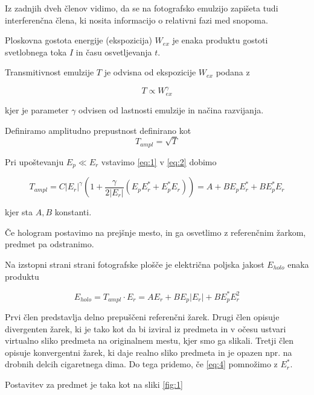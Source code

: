 \documentclass[11pt]{article}
\begin{document}
Iz zadnjih dveh členov vidimo, da se na fotografsko emulzijo zapišeta tudi interferenčna člena, ki nosita informacijo o relativni fazi med snopoma.

Ploskovna gostota energije (ekspozicija) \(W_{ex}\) je enaka produktu gostoti svetlobnega toka \(I\) in času osvetljevanja \(t\).

Transmitivnost emulzije \(T\) je odvisna od ekspozicije \(W_{ex}\) podana z

\[ T \propto W_{ex}^{\gamma}
\]

kjer je parameter \(\gamma\) odvisen od lastnosti emulzije in načina razvijanja.

Definiramo amplitudno prepustnost definirano kot
\begin{equation}
\label{eq:2}
T_{ampl} = \sqrt{T}
\end{equation}

Pri upoštevanju \(E_p \ll E_r\) vstavimo \ref{eq:1} v \ref{eq:2} dobimo

\begin{equation}
\label{eq:3}
T_{ampl} = C \left| E_r \right| ^{\gamma} \left( 1 + \frac{\gamma}{2 \left| E_r \right|} (E_p E^{*}_r + E_p^{*}E_r) \right) = A + BE_p E^{*}_r + BE_p^{*}E_r
\end{equation}

kjer sta \(A, B\) konstanti.

Če hologram postavimo na prejšnje mesto, in ga osvetlimo z referenčnim žarkom, predmet pa odstranimo.

Na izstopni strani strani fotografske plošče je električna poljska jakost \(E_{holo}\) enaka produktu

\begin{equation}
\label{eq:4}
E_{holo} = T_{ampl} \cdot E_r =  AE_r + BE_p \left| E_r \right| + BE_p^{*}E_r^2
\end{equation}

Prvi člen predstavlja delno prepuščeni referenčni žarek. Drugi člen opisuje divergenten žarek, ki je tako kot da bi izviral iz predmeta in v očesu ustvari virtualno sliko predmeta na originalnem mestu, kjer smo ga slikali.
Tretji člen opisuje konvergentni žarek, ki daje realno sliko predmeta in je opazen npr. na drobnih delcih cigaretnega dima. Do tega pridemo, če \ref{eq:4} pomnožimo z \(E_r^{*}\).

Postavitev za predmet je taka kot na sliki \ref{fig:1}
\end{document}

